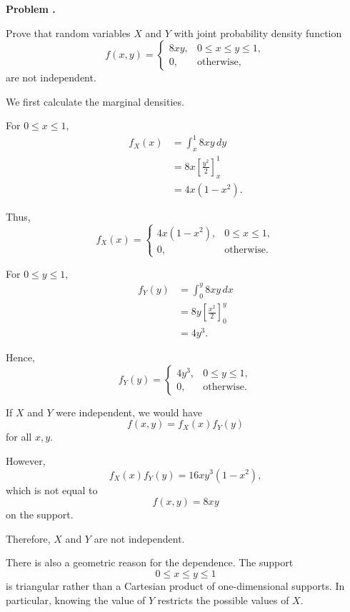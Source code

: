 \documentclass[11pt]{article}
\newcounter{problem}
\newenvironment{problem}[1][]{
    \refstepcounter{problem}
    \begin{problemheader}
        \textbf{Problem \theproblem%
        \if\relax\detokenize{#1}\relax
        \else. #1%
        \fi}
    \end{problemheader}
}{
    \vspace{0.5em}
}
\newenvironment{solution}{
    \par
    \begin{tcolorbox}[
        colback=white,
        colframe=uwgold,
        boxrule=0.7pt,
        arc=2mm,
        left=3mm,
        right=3mm,
        top=2mm,
        bottom=2mm,
        breakable,
        before skip=0.5em,
        after skip=1em,
        title=\textbf{Solution},
        coltitle=uwpurple,
        fonttitle=\bfseries
    ]
}{
    \end{tcolorbox}
}
\begin{document}

\newpage
\begin{problem}

Prove that random variables \(X\) and \(Y\) with joint probability density
function
\[
f(x,y)
=
\begin{cases}
8xy,
&
0\leq x\leq y\leq1,\\
0,
&
\text{otherwise},
\end{cases}
\]
are not independent.

\end{problem}

\begin{solution}

We first calculate the marginal densities.

For \(0\leq x\leq1\),
\[
\begin{aligned}
f_X(x)
&=
\int_x^1 8xy\,dy\\
&=
8x\left[\frac{y^2}{2}\right]_x^1\\
&=
4x(1-x^2).
\end{aligned}
\]

Thus,
\[
f_X(x)
=
\begin{cases}
4x(1-x^2), & 0\leq x\leq1,\\
0, & \text{otherwise}.
\end{cases}
\]

For \(0\leq y\leq1\),
\[
\begin{aligned}
f_Y(y)
&=
\int_0^y8xy\,dx\\
&=
8y\left[\frac{x^2}{2}\right]_0^y\\
&=
4y^3.
\end{aligned}
\]

Hence,
\[
f_Y(y)
=
\begin{cases}
4y^3, & 0\leq y\leq1,\\
0, & \text{otherwise}.
\end{cases}
\]

If \(X\) and \(Y\) were independent, we would have
\[
f(x,y)=f_X(x)f_Y(y)
\]
for all \(x,y\).

However,
\[
f_X(x)f_Y(y)
=
16xy^3(1-x^2),
\]
which is not equal to
\[
f(x,y)=8xy
\]
on the support.

Therefore, \(X\) and \(Y\) are not independent.

There is also a geometric reason for the dependence. The support
\[
0\leq x\leq y\leq1
\]
is triangular rather than a Cartesian product of one-dimensional supports.
In particular, knowing the value of \(Y\) restricts the possible values of
\(X\).

\end{solution}
\end{document}
